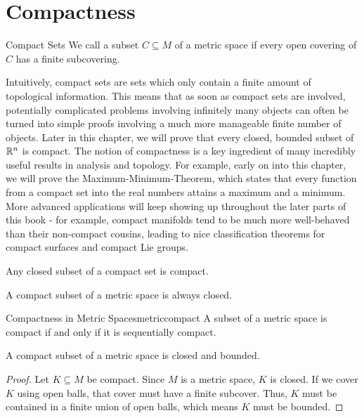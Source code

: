 \section{Compactness}
\begin{importantdefinition}{Compact Sets}{}
	We call a subset $C \subseteq M$ of a metric space  if every open covering of $C$ has a finite subcovering.
\end{importantdefinition}
Intuitively, compact sets are sets which only contain a finite amount of topological information. This means that as soon as compact sets are involved, potentially complicated problems involving infinitely many objects can often be turned into simple proofs involving a much more manageable finite number of objects. Later in this chapter, we will prove that every closed, bounded subset of $\mathbb{R}^n$ is compact.
\newpar
The notion of compactness is a key ingredient of many incredibly useful results in analysis and topology. For example, early on into this chapter, we will prove the Maximum-Minimum-Theorem, which states that every function from a compact set into the real numbers attains a maximum and a minimum. More advanced applications will keep showing up throughout the later parts of this book - for example, compact manifolds tend to be much more well-behaved than their non-compact cousins, leading to nice classification theorems for compact surfaces and compact Lie groups.
\begin{exercise}
	\label{th:subsetcompact}
	Any closed subset of a compact set is compact.
\end{exercise}
\begin{exercise}
	A compact subset of a metric space is always closed.
\end{exercise}
\begin{importanttheorem}{Compactness in Metric Spaces}{metriccompact}
	A subset of a metric space is compact if and only if it is sequentially compact.
\end{importanttheorem}
\begin{theorem}
	\label{th:compactclosedbounded}
	A compact subset of a metric space is closed and bounded.
\end{theorem}
\begin{proof}
	Let $K \subseteq M$ be compact. Since $M$ is a metric space, $K$ is closed. If we cover $K$ using open balls, that cover must have a finite subcover. Thus, $K$ must be contained in a finite union of open balls, which means $K$ must be bounded.
\end{proof}
